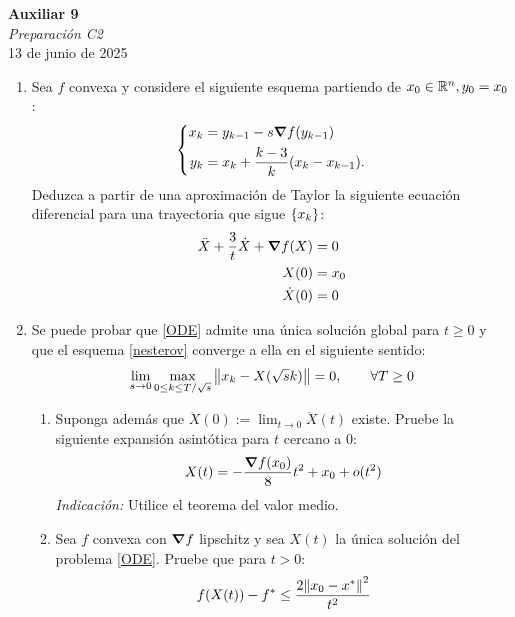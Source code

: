 \documentclass{article}
\begin{document}


\begin{center}
	\Huge{\textbf{Auxiliar 9}}\\
	\textit{\large{Preparación C2}}\\
	\normalsize
	13 de junio de 2025
\end{center}

\begin{enumerate}
	\item Sea \(f\) convexa y considere el siguiente esquema partiendo de \(x_0 \in \mathbb{R}^n, y_0 = x_0\):
	\begin{equation} \label{nesterov}
		\left\{\begin{aligned}
			x_k &= y_{k-1} - s \grad f (y_{k-1}) \\
			y_k &= x_k + \frac{k-3}{k} (x_k - x_{k-1}).
		\end{aligned}\right.
	\end{equation}
	Deduzca a partir de una aproximación de Taylor la siguiente ecuación diferencial para una trayectoria que sigue \(\qty{x_k}\):
	\begin{align} \label{ODE}
		\ddot{X} + \frac{3}{t} \dot{X} + \grad f(X) &= 0 \\
		X(0) &= x_0 \\
		\dot{X}(0) &= 0
	\end{align}

	\item Se puede probar que \ref{ODE} admite una única solución global para \(t \geq 0\) y que el esquema \ref{nesterov} converge a ella en el siguiente sentido:
	\[\lim_{s \to 0} \max_{0 \leq k \leq T/\sqrt{s}} \norm{x_k - X(\sqrt{s}k)} = 0, \qquad \forall T \geq 0\]
	\begin{enumerate}
		\item Suponga además que \( \ddot{X}(0) := \lim_{t \to 0} \ddot{X}(t)\) existe. Pruebe la siguiente expansión asintótica para \(t\) cercano a 0:
		\[X(t) = - \frac{\grad f(x_0)}{8}t^2 + x_0 + o(t^2)\]
		\textit{Indicación:} Utilice el teorema del valor medio.
		\item Sea \(f\) convexa con \(\grad f\) lipschitz y sea \(X(t)\) la única solución del problema \ref{ODE}. Pruebe que para \(t > 0\):
		\[f(X(t)) - f^* \leq \frac{2 \norm{x_0 - x^*}^2}{t^2}\]
	\end{enumerate}
\end{enumerate}
\end{document}
